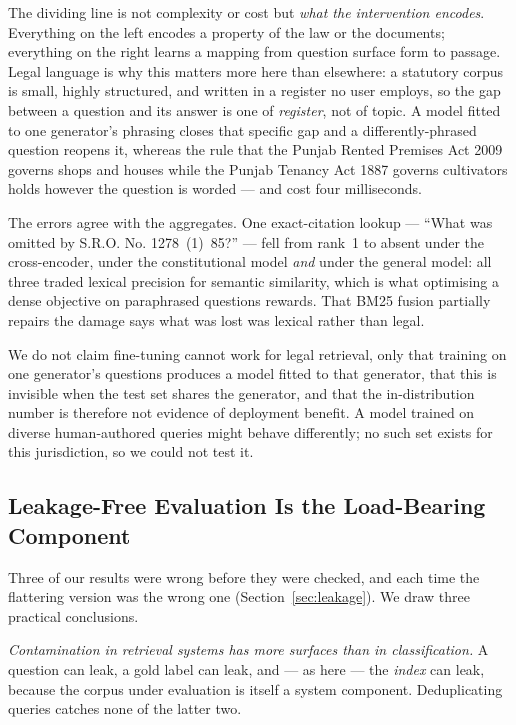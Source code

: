 \documentclass[conference]{IEEEtran}
\begin{document}
The dividing line is not complexity or cost but \emph{what the intervention
encodes}. Everything on the left encodes a property of the law or the documents;
everything on the right learns a mapping from question surface form to passage.
Legal language is why this matters more here than elsewhere: a statutory corpus
is small, highly structured, and written in a register no user employs, so the
gap between a question and its answer is one of \emph{register}, not of topic. A
model fitted to one generator's phrasing closes that specific gap and a
differently-phrased question reopens it, whereas the rule that the Punjab Rented
Premises Act 2009 governs shops and houses while the Punjab Tenancy Act 1887
governs cultivators holds however the question is worded --- and cost four
milliseconds.

The errors agree with the aggregates. One exact-citation lookup ---
``What was omitted by S.R.O. No. 1278~(1)~85?'' --- fell from rank~1 to absent
under the cross-encoder, under the constitutional model \emph{and} under the
general model: all three traded lexical precision for semantic similarity,
which is what optimising a dense objective on paraphrased questions rewards.
That BM25 fusion partially repairs the damage says what was lost was lexical
rather than legal.

We do not claim fine-tuning cannot work for legal retrieval, only that training
on one generator's questions produces a model fitted to that generator, that
this is invisible when the test set shares the generator, and that the
in-distribution number is therefore not evidence of deployment benefit. A model
trained on diverse human-authored queries might behave differently; no such set
exists for this jurisdiction, so we could not test it.

\subsection{Leakage-Free Evaluation Is the Load-Bearing Component}
\label{sec:whyleakage}
Three of our results were wrong before they were checked, and each time the
flattering version was the wrong one (Section~\ref{sec:leakage}). We draw three
practical conclusions.

\emph{Contamination in retrieval systems has more surfaces than in
classification.} A question can leak, a gold label can leak, and --- as here ---
the \emph{index} can leak, because the corpus under evaluation is itself a
system component. Deduplicating queries catches none of the latter two.
\end{document}
